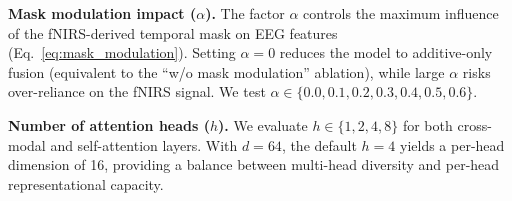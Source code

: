 \documentclass[preprint,12pt,authoryear]{elsarticle}
\begin{document}
\noindent\textbf{Mask modulation impact ($\alpha$).} The factor $\alpha$ controls the maximum influence of the fNIRS-derived temporal mask on EEG features (Eq.~\ref{eq:mask_modulation}). Setting $\alpha = 0$ reduces the model to additive-only fusion (equivalent to the ``w/o mask modulation'' ablation), while large $\alpha$ risks over-reliance on the fNIRS signal. We test $\alpha \in \{0.0, 0.1, 0.2, 0.3, 0.4, 0.5, 0.6\}$.

\noindent\textbf{Number of attention heads ($h$).} We evaluate $h \in \{1, 2, 4, 8\}$ for both cross-modal and self-attention layers. With $d = 64$, the default $h = 4$ yields a per-head dimension of 16, providing a balance between multi-head diversity and per-head representational capacity.






\end{document}
